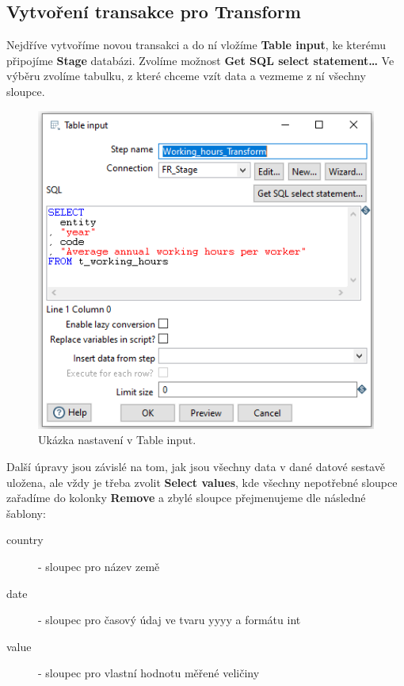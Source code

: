 \documentclass[thesis=M,czech]{FITthesis}[2022/10/08]
\begin{document}
\subsection{Vytvoření transakce pro Transform}
Nejdříve vytvoříme novou transakci a do ní vložíme \textbf{Table input}, ke kterému připojíme \textbf{Stage} databázi. Zvolíme možnost \textbf{Get SQL select statement…} Ve výběru zvolíme tabulku, z které chceme vzít data a vezmeme z ní všechny sloupce. 

\begin{figure}
    \centering
    \includegraphics[width=\textwidth]{DP-obrazky/table_input.png}
    \caption{Ukázka nastavení v Table input.}
    \label{fig:Table_input}
\end{figure}

Další úpravy jsou závislé na tom, jak jsou všechny data v dané datové sestavě uložena, ale vždy je třeba zvolit \textbf{Select values}, kde všechny nepotřebné sloupce zařadíme do kolonky \textbf{Remove} a zbylé sloupce přejmenujeme dle následné šablony:

\begin{description}
    \item[country] - sloupec pro název země
    \item[date] - sloupec pro časový údaj ve tvaru yyyy a formátu int
    \item[value] - sloupec pro vlastní hodnotu měřené veličiny
\end{description}
\end{document}
